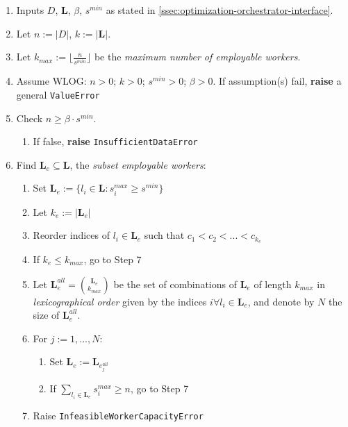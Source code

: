 \documentclass[../mthe-493-final-project.tex]{subfiles}
\begin{document}
    \begin{enumerate}
        \item Inputs $D$, $\mathbf{L}$, $\beta$, $s^{min}$ as stated in \autoref{ssec:optimization-orchestrator-interface}.
        \item Let $n := \vert D \vert$, $k := \vert \mathbf{L} \vert$.
        \item Let $k_{max} := \lfloor \frac{n}{s^{min}} \rfloor$ be the \textit{maximum number of employable workers}.
        \item Assume WLOG: $n > 0$; $k > 0$; $s^{min} > 0$; $\beta > 0$. If assumption(s) fail, \textbf{raise} a general \texttt{ValueError}
        \item Check $n \geq \beta \cdot s^{min}$.
            \begin{enumerate}
                \item If false, \textbf{raise} \texttt{InsufficientDataError}
            \end{enumerate}
        \item Find $\mathbf{L}_e \subseteq \mathbf{L}$, the \textit{subset employable workers}:
            \begin{enumerate}
                \item Set $\mathbf{L}_e := \{ l_i \in \mathbf{L} : s^{max}_i \geq s^{min} \}$
                \item Let $k_e := \vert \mathbf{L}_e \vert$
                \item Reorder indices of $l_i \in \mathbf{L}_e$ such that $c_1 < c_2 < ... < c_{k_e}$
                \item If $k_e \leq k_{max}$, go to Step 7
                \item Let $\mathbf{L}_e^{all} = {\mathbf{L}_e \choose k_{max}}$ be the set of combinations of $\mathbf{L}_e$ of length $k_{max}$ in \textit{lexicographical order} given by the indices $i \forall l_i \in \mathbf{L}_e$, and denote by $N$ the size of $\mathbf{L}_e^{all}$.
                \item For $j := 1, ..., N$:
                    \begin{enumerate}
                        \item Set $\mathbf{L}_e := \mathbf{L}_{e^{all}_j}$
                        \item If $\sum_{l_i \in \mathbf{L}_e} s^{max}_i \geq n$, go to Step 7
                    \end{enumerate}
                \item Raise \texttt{InfeasibleWorkerCapacityError}

\end{enumerate}
\end{enumerate}
\end{document}
